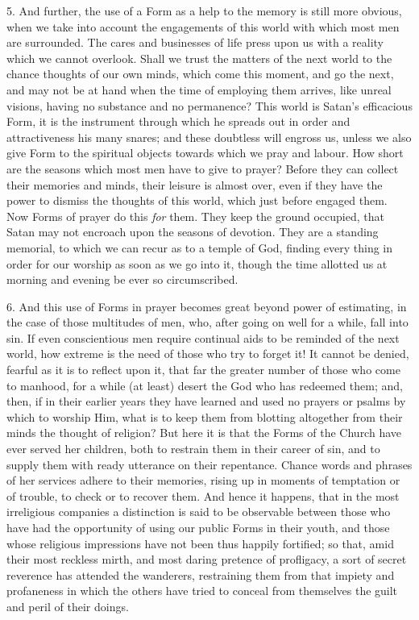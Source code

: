 5. And further, the use of a Form as a help to the
memory is still more obvious, when we take into account the engagements of this world with which most men are
surrounded. The cares and businesses of life press upon
us with a reality which we cannot overlook. Shall we
trust the matters of the next world to the chance
thoughts of our own minds, which come this moment, and go
the next, and may not be at hand when the time of
employing them arrives, like unreal visions, having no
substance and no permanence? This world is Satan's
efficacious Form, it is the instrument through which he
spreads out in order and attractiveness his many snares;
and these doubtless will engross us, unless we also give
Form to the spiritual objects towards which we pray and
labour. How short are the seasons which most men have to
give to prayer? Before they can collect their memories
and minds, their leisure is almost over, even if they
have the power to dismiss the thoughts of this world,
which just before engaged them. Now Forms of prayer do
this \emph{for} them. They keep the ground occupied, that
Satan may not encroach upon the seasons of devotion. They
are a standing memorial, to which we can recur as to a
temple of God, finding every thing in order for our
worship as soon as we go into it, though the time
allotted us at morning and evening be ever so
circumscribed.

6. And this use of Forms in prayer becomes great
beyond power of estimating, in the case of those
multitudes of men, who, after going on well for a while,
fall into sin. If even conscientious men require
continual aids to be reminded of the next world, how
extreme is the need of those who try to forget it! It
cannot be denied, fearful as it is to reflect upon it,
that far the greater number of those who come to manhood,
for a while (at least) desert the God who has redeemed
them; and, then, if in their earlier years they have
learned and used no prayers or psalms by which to worship
Him, what is to keep them from blotting altogether from
their minds the thought of religion? But here it is that
the Forms of the Church have ever served her children,
both to restrain them in their career of sin, and to
supply them with ready utterance on their repentance.
Chance words and phrases of her services adhere to their
memories, rising up in moments of temptation or of
trouble, to check or to recover them. And hence it
happens, that in the most irreligious companies a
distinction is said to be observable between those who
have had the opportunity of using our public Forms in
their youth, and those whose religious impressions have
not been thus happily fortified; so that, amid their most
reckless mirth, and most daring pretence of profligacy, a
sort of secret reverence has attended the wanderers,
restraining them from that impiety and profaneness in
which the others have tried to conceal from themselves
the guilt and peril of their doings.

